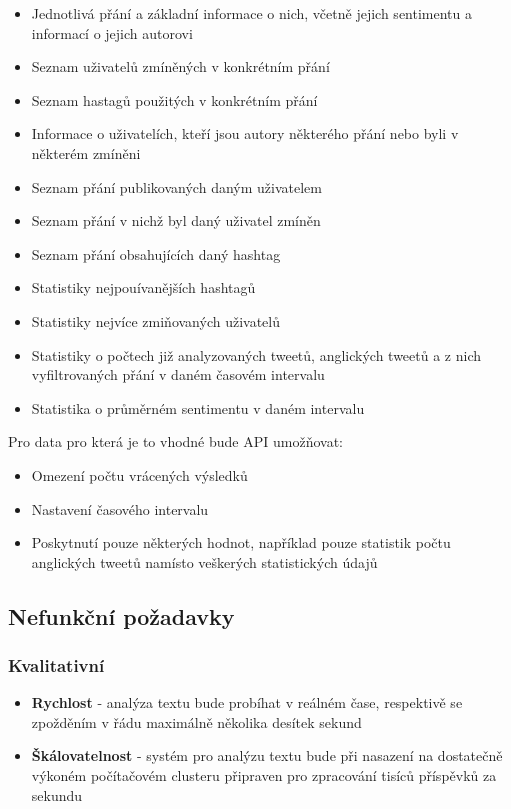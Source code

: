 \documentclass[thesis=B,czech]{FITthesis}[2012/06/26]
\begin{document}
\begin{itemize}
\item Jednotlivá přání a základní informace o nich, včetně jejich sentimentu a informací o jejich autorovi
\item Seznam uživatelů zmíněných v konkrétním přání
\item Seznam hastagů použitých v konkrétním přání
\item Informace o uživatelích, kteří jsou autory některého přání nebo byli v některém zmíněni
\item Seznam přání publikovaných daným uživatelem
\item Seznam přání v nichž byl daný uživatel zmíněn
\item Seznam přání obsahujících daný hashtag
\item Statistiky nejpouívanějších hashtagů
\item Statistiky nejvíce zmiňovaných uživatelů
\item Statistiky o počtech již analyzovaných tweetů, anglických tweetů a z nich vyfiltrovaných přání v daném časovém intervalu
\item Statistika o průměrném sentimentu v daném intervalu
\end{itemize}

\noindent Pro data pro která je to vhodné bude API umožňovat:
\begin{itemize}
\item Omezení počtu vrácených výsledků
\item Nastavení časového intervalu
\item Poskytnutí pouze některých hodnot, například pouze statistik počtu anglických tweetů namísto veškerých statistických údajů
\end{itemize}

\subsection{Nefunkční požadavky}
\subsubsection{Kvalitativní}
\begin{itemize}
\item \textbf{Rychlost} - analýza textu bude probíhat v reálném čase, respektivě se zpožděním v řádu maximálně několika desítek sekund
\item \textbf{Škálovatelnost} - systém pro analýzu textu bude při nasazení na dostatečně výkoném počítačovém clusteru připraven pro zpracování tisíců příspěvků za sekundu
\end{itemize}
\end{document}
